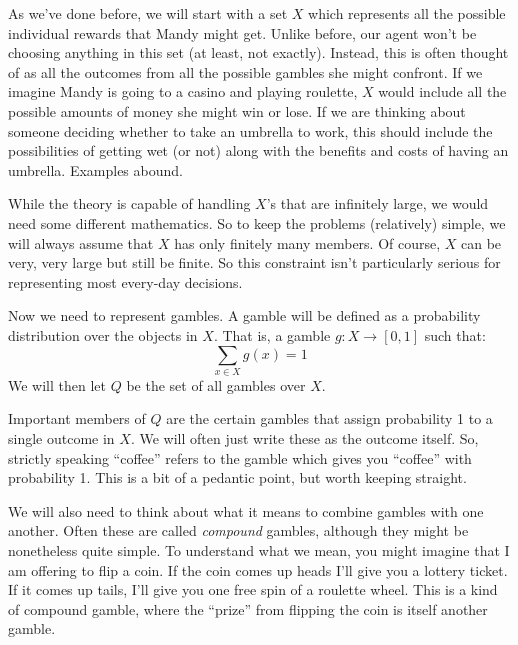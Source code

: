 As we've done before, we will start with a set $X$ which represents all the possible individual rewards that Mandy might get.  Unlike before, our agent won't be choosing anything in this set (at least, not exactly). Instead, this is often thought of as all the outcomes from all the possible gambles she might confront.  If we imagine Mandy is going to a casino and playing roulette, $X$ would include all the possible amounts of money she might win or lose.  If we are thinking about someone deciding whether to take an umbrella to work, this should include the possibilities of getting wet (or not) along with the benefits and costs of having an umbrella.   Examples abound.

While the theory is capable of handling $X$'s that are infinitely large, we would need some different mathematics.  So to keep the problems (relatively) simple, we will always assume that $X$ has only finitely many members. Of course, $X$ can be very, very large but still be finite. So this constraint isn't particularly serious for representing most every-day decisions.

Now we need to represent gambles.  A gamble will be defined as a probability distribution over the objects in $X$. That is, a gamble $g: X \to [0,1]$ such that:
\[\sum_{x \in X} g(x) = 1\]
We will then let $Q$ be the set of all gambles over $X$.



Important members of $Q$ are the certain gambles that assign probability 1 to a single outcome in $X$.  We will often just write these as the outcome itself. So, strictly speaking ``coffee'' refers to the gamble which gives you ``coffee'' with probability 1.  This is a bit of a pedantic point, but worth keeping straight.

We will also need to think about what it means to combine gambles with one another. Often these are called {\it compound} gambles, although they might be nonetheless quite simple.  To understand what we mean, you might imagine that I am offering to flip a coin.  If the coin comes up heads I'll give you a lottery ticket. If it comes up tails, I'll give you one free spin of a roulette wheel.  This is a kind of compound gamble, where the ``prize'' from flipping the coin is itself another gamble.

